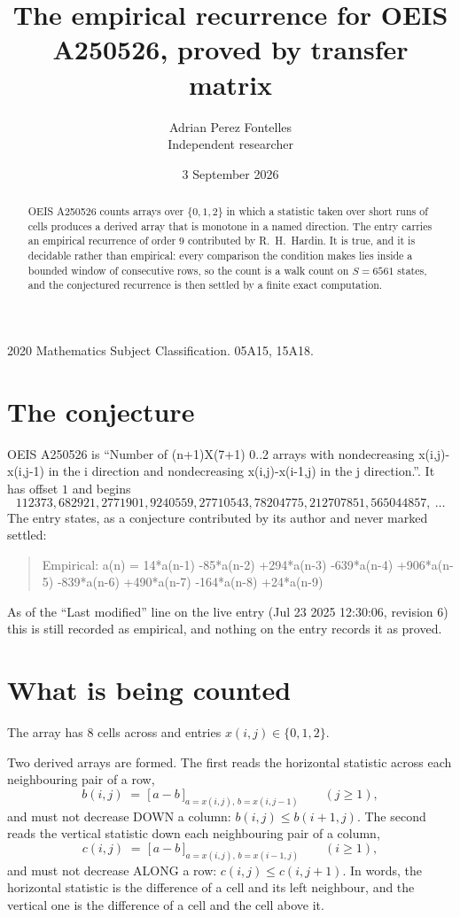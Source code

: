 \documentclass[11pt,a4paper]{article}
\title{The empirical recurrence for OEIS A250526, proved by transfer matrix}
\author{Adrian Perez Fontelles\\ \small Independent researcher}
\date{3 September 2026}
\theoremstyle{plain}
\theoremstyle{definition}
\begin{document}
\maketitle

\begin{abstract}
OEIS A250526 counts arrays over $\{0,1,2\}$ in which a statistic taken over short runs
of cells produces a derived array that is monotone in a named direction. The entry carries an
empirical recurrence of order $9$ contributed by R.~H.~Hardin. It is true, and it is
decidable rather than empirical: every comparison the condition makes lies inside a bounded
window of consecutive rows, so the count is a walk count on $S=6561$ states, and the
conjectured recurrence is then settled by a finite exact computation.
\end{abstract}

\noindent\small 2020 Mathematics Subject Classification. 05A15, 15A18.\normalsize

\section{The conjecture}

OEIS A250526 is ``Number of (n+1)X(7+1) 0..2 arrays with nondecreasing x(i,j)-x(i,j-1) in the i direction and nondecreasing x(i,j)-x(i-1,j) in the j direction.''. It has offset $1$ and begins
\[
112373, 682921, 2771901, 9240559, 27710543, 78204775, 212707851, 565044857,\ \dots
\]
The entry states, as a conjecture contributed by its author and never marked settled:
\begin{quote}
Empirical: a(n) = 14*a(n-1) -85*a(n-2) +294*a(n-3) -639*a(n-4) +906*a(n-5) -839*a(n-6) +490*a(n-7) -164*a(n-8) +24*a(n-9)
\end{quote}
As of the ``Last modified'' line on the live entry (Jul 23 2025 12:30:06, revision 6) this is still
recorded as empirical, and nothing on the entry records it as proved.

\section{What is being counted}

The array has $8$ cells across and entries $x(i,j)\in\{0,1,2\}$.

Two derived arrays are formed. The first reads the horizontal statistic across each
neighbouring pair of a row,
\[
b(i,j)\;=\;\bigl[\,a-b\,\bigr]_{a=x(i,j),\,b=x(i,j-1)}\qquad (j\ge1),
\]
and must not decrease DOWN a column: $b(i,j)\le b(i{+}1,j)$. The second reads the vertical
statistic down each neighbouring pair of a column,
\[
c(i,j)\;=\;\bigl[\,a-b\,\bigr]_{a=x(i,j),\,b=x(i{-}1,j)}\qquad (i\ge1),
\]
and must not decrease ALONG a row: $c(i,j)\le c(i,j{+}1)$. In words, the horizontal statistic
is the difference of a cell and its left neighbour, and the vertical one is
the difference of a cell and the cell above it.
\end{document}
